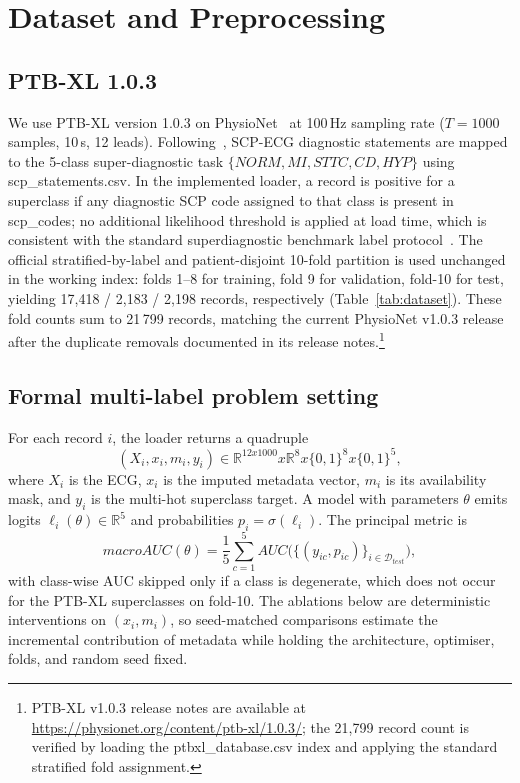 \documentclass[mathematics,article,submit,pdftex]{Definitions/mdpi}
\def\texttt#1{#1}%
\def\mathrm#1{#1}%
\def\mathbf#1{#1}%
\def\bm#1{#1}%
\def\times{x}%
\begin{document}
\section{Dataset and Preprocessing}\label{sec:dataset}

\subsection{PTB-XL 1.0.3}
We use PTB-XL version 1.0.3 on PhysioNet~\cite{Wagner2020,Goldberger2000} at 100\,Hz sampling rate ($T{=}1000$ samples, 10\,s, 12 leads). Following~\cite{Strodthoff2021}, SCP-ECG diagnostic statements are mapped to the 5-class super-diagnostic task $\{\mathrm{NORM}, \mathrm{MI}, \mathrm{STTC}, \mathrm{CD}, \mathrm{HYP}\}$ using \texttt{scp\_statements.csv}. In the implemented loader, a record is positive for a superclass if any diagnostic SCP code assigned to that class is present in \texttt{scp\_codes}; no additional likelihood threshold is applied at load time, which is consistent with the standard superdiagnostic benchmark label protocol~\cite{Strodthoff2021}. The official stratified-by-label and patient-disjoint 10-fold partition is used unchanged in the working index: folds 1--8 for training, fold 9 for validation, fold-10 for test, yielding 17{,}418 / 2{,}183 / 2{,}198 records, respectively (Table~\ref{tab:dataset}). These fold counts sum to 21\,799 records, matching the current PhysioNet v1.0.3 release after the duplicate removals documented in its release notes.\footnote{PTB-XL v1.0.3 release notes are available at \url{https://physionet.org/content/ptb-xl/1.0.3/}; the 21{,}799 record count is verified by loading the \texttt{ptbxl\_database.csv} index and applying the standard stratified fold assignment.}

\subsection{Formal multi-label problem setting}
For each record $i$, the loader returns a quadruple
\[
(\mathbf{X}_i,\mathbf{x}_i,\mathbf{m}_i,\mathbf{y}_i)
\in \mathbb{R}^{12\times1000}\times\mathbb{R}^{8}\times\{0,1\}^{8}\times\{0,1\}^{5},
\]
where $\mathbf{X}_i$ is the ECG, $\mathbf{x}_i$ is the imputed metadata vector, $\mathbf{m}_i$ is its availability mask, and $\mathbf{y}_i$ is the multi-hot superclass target. A model with parameters $\theta$ emits logits $\bm{\ell}_{i}(\theta)\in\mathbb{R}^{5}$ and probabilities $\mathbf{p}_{i}=\sigma(\bm{\ell}_{i})$. The principal metric is
\[
\mathrm{macroAUC}(\theta)=\frac{1}{5}\sum_{c=1}^{5}\mathrm{AUC}\bigl(\{(y_{ic},p_{ic})\}_{i\in\mathcal{D}_{\mathrm{test}}}\bigr),
\]
with class-wise AUC skipped only if a class is degenerate, which does not occur for the PTB-XL superclasses on fold-10. The ablations below are deterministic interventions on $(\mathbf{x}_i,\mathbf{m}_i)$, so seed-matched comparisons estimate the incremental contribution of metadata while holding the architecture, optimiser, folds, and random seed fixed.
\end{document}
